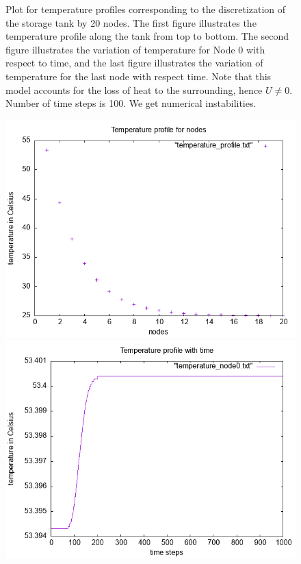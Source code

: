 \documentclass{article}
\begin{document}
\begin{figure}[ht]
\caption{Plot for temperature profiles corresponding to the discretization of the storage tank by 20 nodes. The first figure illustrates the temperature profile along the tank from top to bottom. The second figure illustrates the variation of temperature for Node 0 with respect to time, and the last figure illustrates the variation of temperature for the last node with respect time. Note that this model accounts for the loss of heat to the surrounding, hence $U \neq 0$. Number of time steps is 100. We get numerical instabilities.}
\end{figure}

\begin{figure}[ht]
\centering
\includegraphics[scale = 0.5]{temperature_profile_N_20.png}
\includegraphics[scale =0.5]{temperature_node0_N_20.png}

\end{figure}
\end{document}

